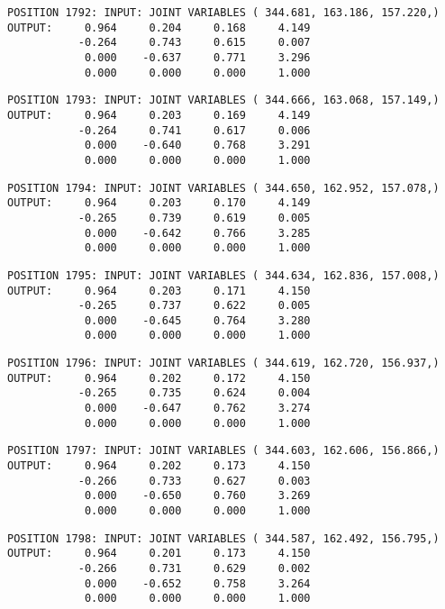 \begin{verbatim}
POSITION 1792: INPUT: JOINT VARIABLES ( 344.681, 163.186, 157.220,)
OUTPUT:     0.964     0.204     0.168     4.149
           -0.264     0.743     0.615     0.007
            0.000    -0.637     0.771     3.296
            0.000     0.000     0.000     1.000
\end{verbatim} \pagebreak[1]\begin{verbatim}
POSITION 1793: INPUT: JOINT VARIABLES ( 344.666, 163.068, 157.149,)
OUTPUT:     0.964     0.203     0.169     4.149
           -0.264     0.741     0.617     0.006
            0.000    -0.640     0.768     3.291
            0.000     0.000     0.000     1.000
\end{verbatim} \pagebreak[1]\begin{verbatim}
POSITION 1794: INPUT: JOINT VARIABLES ( 344.650, 162.952, 157.078,)
OUTPUT:     0.964     0.203     0.170     4.149
           -0.265     0.739     0.619     0.005
            0.000    -0.642     0.766     3.285
            0.000     0.000     0.000     1.000
\end{verbatim} \pagebreak[1]\begin{verbatim}
POSITION 1795: INPUT: JOINT VARIABLES ( 344.634, 162.836, 157.008,)
OUTPUT:     0.964     0.203     0.171     4.150
           -0.265     0.737     0.622     0.005
            0.000    -0.645     0.764     3.280
            0.000     0.000     0.000     1.000
\end{verbatim} \pagebreak[1]\begin{verbatim}
POSITION 1796: INPUT: JOINT VARIABLES ( 344.619, 162.720, 156.937,)
OUTPUT:     0.964     0.202     0.172     4.150
           -0.265     0.735     0.624     0.004
            0.000    -0.647     0.762     3.274
            0.000     0.000     0.000     1.000
\end{verbatim} \pagebreak[1]\begin{verbatim}
POSITION 1797: INPUT: JOINT VARIABLES ( 344.603, 162.606, 156.866,)
OUTPUT:     0.964     0.202     0.173     4.150
           -0.266     0.733     0.627     0.003
            0.000    -0.650     0.760     3.269
            0.000     0.000     0.000     1.000
\end{verbatim} \pagebreak[1]\begin{verbatim}
POSITION 1798: INPUT: JOINT VARIABLES ( 344.587, 162.492, 156.795,)
OUTPUT:     0.964     0.201     0.173     4.150
           -0.266     0.731     0.629     0.002
            0.000    -0.652     0.758     3.264
            0.000     0.000     0.000     1.000
\end{verbatim} \pagebreak[1]\begin{verbatim}

\end{verbatim}
